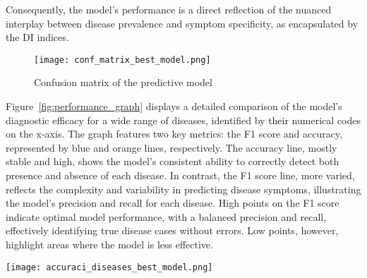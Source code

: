 Consequently, the model's performance is a direct reflection of the nuanced interplay between disease prevalence and symptom specificity,
as encapsulated by the DI indices.
\begin{figure}[h]
	\centering
	\texttt{[image: conf\_matrix\_best\_model.png]}
	\caption{Confusion matrix of the predictive model}\label{fig:conf_matrix}
\end{figure}
\noindent
Figure~\ref{fig:performance_graph} displays a detailed comparison of the model's diagnostic efficacy for a wide range of diseases,
identified by their numerical codes on the x-axis.
The graph features two key metrics: the F1 score and accuracy, represented by blue and orange lines, respectively.
The accuracy line, mostly stable and high, shows the model's consistent ability to correctly detect both presence and absence of each disease.
In contrast, the F1 score line, more varied, reflects the complexity and variability in predicting disease symptoms,
illustrating the model's precision and recall for each disease. High points on the F1 score indicate optimal model performance,
with a balanced precision and recall, effectively identifying true disease cases without errors.
Low points, however, highlight areas where the model is less effective.
\begin{figure*}[htbp]
	\centering
	\texttt{[image: accuraci\_diseases\_best\_model.png]}
	\caption{A comparison of the F1 score and accuracy for each disease predicted by the model.}
	\label{fig:performance_graph}
\end{figure*}
